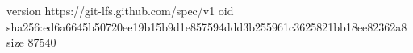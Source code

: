 version https://git-lfs.github.com/spec/v1
oid sha256:ed6a6645b50720ee19b15b9d1e857594ddd3b255961c3625821bb18ee82362a8
size 87540
